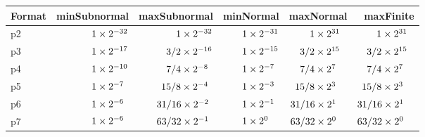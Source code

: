 \begin{tabular}{lrrrrr}
\toprule
Format & minSubnormal & maxSubnormal & minNormal & maxNormal & maxFinite \\
\midrule
p2 & $\binaryfloat{1}{-32}$ & $\binaryfloat{1}{-32}$ & $\binaryfloat{1}{-31}$ & $\binaryfloat{1}{31}$ & $\binaryfloat{1}{31}$ \\
p3 & $\binaryfloat{1}{-17}$ & $\binaryfloat{3/2}{-16}$ & $\binaryfloat{1}{-15}$ & $\binaryfloat{3/2}{15}$ & $\binaryfloat{3/2}{15}$ \\
p4 & $\binaryfloat{1}{-10}$ & $\binaryfloat{7/4}{-8}$ & $\binaryfloat{1}{-7}$ & $\binaryfloat{7/4}{7}$ & $\binaryfloat{7/4}{7}$ \\
p5 & $\binaryfloat{1}{-7}$ & $\binaryfloat{15/8}{-4}$ & $\binaryfloat{1}{-3}$ & $\binaryfloat{15/8}{3}$ & $\binaryfloat{15/8}{3}$ \\
p6 & $\binaryfloat{1}{-6}$ & $\binaryfloat{31/16}{-2}$ & $\binaryfloat{1}{-1}$ & $\binaryfloat{31/16}{1}$ & $\binaryfloat{31/16}{1}$ \\
p7 & $\binaryfloat{1}{-6}$ & $\binaryfloat{63/32}{-1}$ & $\binaryfloat{1}{0}$ & $\binaryfloat{63/32}{0}$ & $\binaryfloat{63/32}{0}$ \\
\bottomrule
\end{tabular}
